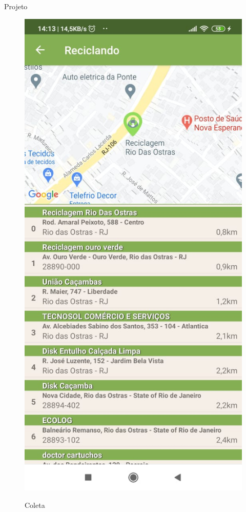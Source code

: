 \documentclass[
	12pt,				%
	openany,			%
	twoside,			%
	a4paper,			%
	english,			%
	french,				%
	spanish,			%
	brazil				%
	]{abntex2}
\begin{document}
\begin{chapter}{Projeto}
\begin{figure}[htb]
\begin{minipage}{0.45\textwidth}
     \label{fig:tela_location_1}
  \end{minipage}
  \hfill
  \begin{minipage}{0.45\textwidth}
    \centering
    \caption{Coleta}
    \includegraphics[scale=0.35]{media/tela_location_2.jpeg}
     \label{fig:tela_location_2}
  \end{minipage}
\end{figure}
\end{chapter}
\end{document}
